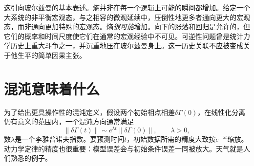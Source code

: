 \begin{classroomqa}
\end{classroomqa}

这引向玻尔兹曼的基本表述。熵并非在每一个逻辑上可能的瞬间都增加。给定一个大系统的非平衡宏观态，与之相容的微观延续中，压倒性地更多者通向更大的宏观态，而非通向更加特殊的宏观态。熵\emph{很可能}增加。向下的涨落和回归是允许的，但它们的概率和时间尺度使它们在通常的宏观经验中不可见。可逆性问题曾是统计力学历史上重大斗争之一，并沉重地压在玻尔兹曼身上。这一历史关联不应被变成关于他生平的简单因果主张。

\section{混沌意味着什么}

为了给出更具操作性的混沌定义，假设两个初始相点相差\(\delta\Gamma(0)\)，在线性化分离仍有意义的范围内，一个混沌方向通常满足
\begin{equation}
 \lVert\delta\Gamma(t)\rVert
 \sim e^{\lambda t}\lVert\delta\Gamma(0)\rVert,
 \qquad \lambda>0,
 \label{eq:sm7-lyapunov-growth}
\end{equation}
数\(\lambda\)是一个李雅普诺夫指数。要预测时间\(t\)，初始数据所需的精度大致按\(e^{-\lambda t}\)缩放。动力学定律的精度也很重要：模型误差会与初始条件误差一同被放大。天气就是人们熟悉的例子。

\begin{classroomqa}
\end{classroomqa}

\begin{classroomqa}
\end{classroomqa}

